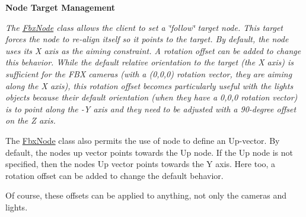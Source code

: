 \begin{Indent}\textbf{ Node Target Management}\par
{\em The \hyperlink{class_fbx_node}{Fbx\+Node} class allows the client to set a \char`\"{}follow\char`\"{} target node. This target forces the node to re-\/align itself so it points to the target. By default, the node uses its X axis as the aiming constraint. A rotation offset can be added to change this behavior. While the default relative orientation to the target (the X axis) is sufficient for the F\+BX cameras (with a (0,0,0) rotation vector, they are aiming along the X axis), this rotation offset becomes particularly useful with the lights objects because their default orientation (when they have a 0,0,0 rotation vector) is to point along the -\/Y axis and they need to be adjusted with a 90-\/degree offset on the Z axis.

The \hyperlink{class_fbx_node}{Fbx\+Node} class also permits the use of node to define an Up-\/vector. By default, the node\textquotesingle{}s up vector points towards the Up node. If the Up node is not specified, then the node\textquotesingle{}s Up vector points towards the Y axis. Here too, a rotation offset can be added to change the default behavior.

Of course, these offsets can be applied to anything, not only the cameras and lights.

}
\end{Indent}
